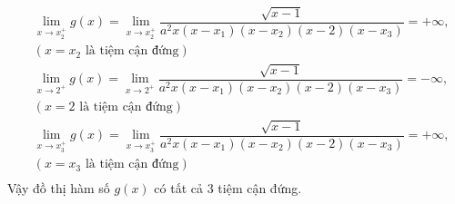 \begin{ex}
{\begin{align*}
            &\lim\limits_{x\to x_2^+}g(x)=\lim\limits_{x\to x_2^+}\dfrac{\sqrt{x-1}}{a^2x(x-x_1)(x-x_2)(x-2)(x-x_3)}=+\infty,\\
            & (x=x_2\mbox{ là tiệm cận đứng}) \\
            &\lim\limits_{x\to 2^+}g(x)=\lim\limits_{x\to 2^+}\dfrac{\sqrt{x-1}}{a^2x(x-x_1)(x-x_2)(x-2)(x-x_3)}=-\infty,\\
            & (x=2\mbox{ là tiệm cận đứng}) \\
            &\lim\limits_{x\to x_3^+}g(x)=\lim\limits_{x\to x_3^+}\dfrac{\sqrt{x-1}}{a^2x(x-x_1)(x-x_2)(x-2)(x-x_3)}=+\infty,\\
            & (x=x_3\mbox{ là tiệm cận đứng}) \\
        \end{align*}
        Vậy đồ thị hàm số $g(x)$ có tất cả $3$ tiệm cận đứng.
    }
\end{ex}
